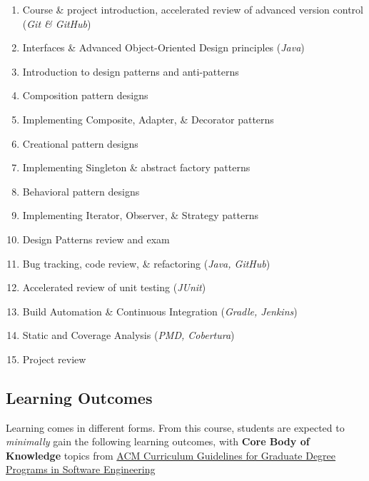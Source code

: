 \documentclass[12pt]{article}
\begin{document}
  \begin{enumerate}
    \item Course \& project introduction, accelerated review of advanced version control (\textit{Git \& GitHub})
    \item Interfaces \& Advanced Object-Oriented Design principles (\textit{Java})
    \item Introduction to design patterns and anti-patterns
    \item Composition pattern designs
    \item Implementing Composite, Adapter, \& Decorator patterns
    \item Creational pattern designs
    \item Implementing Singleton \& abstract factory patterns
    \item Behavioral pattern designs
    \item Implementing Iterator, Observer, \& Strategy patterns
    \item Design Patterns review and exam
    \item Bug tracking, code review, \& refactoring (\textit{Java, GitHub})
    \item Accelerated review of unit testing (\textit{JUnit})
    \item Build Automation \& Continuous Integration (\textit{Gradle, Jenkins})
    \item Static and Coverage Analysis (\textit{PMD, Cobertura})
    \item Project review
  \end{enumerate}

  \subsection*{Learning Outcomes}
  \noindent
  Learning comes in different forms. From this course, students are expected to \textit{minimally} gain the following learning outcomes, with \textbf{Core Body of Knowledge} topics from \href{https://www.acm.org/binaries/content/assets/education/gsew2009.pdf}{ACM Curriculum Guidelines for Graduate Degree Programs in Software Engineering}
\end{document}
